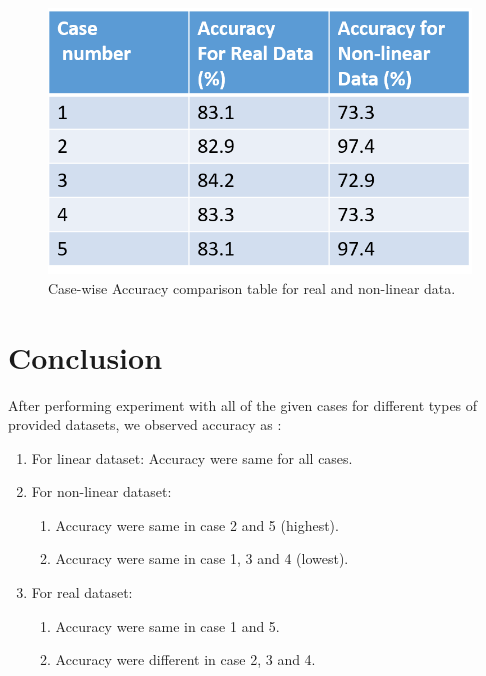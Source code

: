 \documentclass[10pt]{report}
\begin{document}
\begin{figure}
\begin{center}
\includegraphics[scale=0.5]{table.png}
\caption{Case-wise Accuracy comparison table for real and non-linear data.}
\end{center}
\end{figure}
\newpage
\newpage
\newpage
\newpage
\newpage
\newpage
\section{Conclusion}
After performing experiment with all of the given cases for different types of provided datasets, we observed accuracy as :
\begin{enumerate}
\item For linear dataset: Accuracy were same for all cases.
\item For non-linear dataset: 
	\begin{enumerate}
		\item Accuracy were same in case 2 and 5 (highest).
    	\item Accuracy were same in case 1, 3 and 4 (lowest).
     \end{enumerate}
\item For real dataset: 
	\begin{enumerate}
		\item Accuracy were same in case 1 and 5.
    	\item Accuracy were different in case 2, 3 and 4.    
     \end{enumerate}
\end{enumerate}
\end{document}
